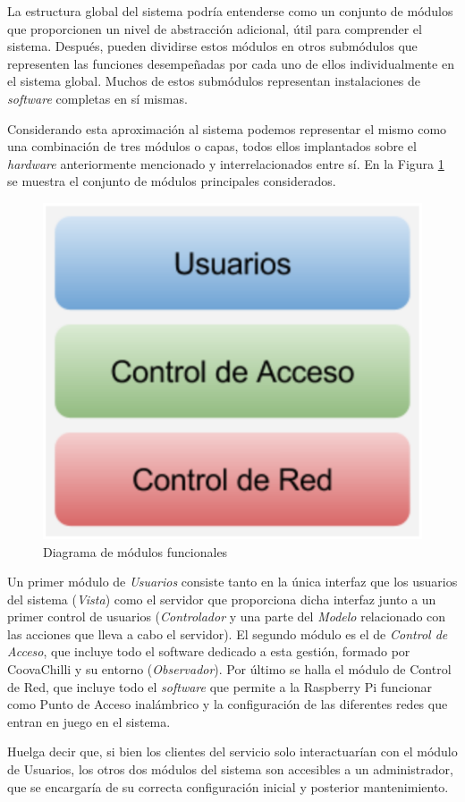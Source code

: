 La estructura global del sistema podría entenderse como un conjunto de módulos que proporcionen un nivel de abstracción adicional, útil para comprender el sistema. Después, pueden dividirse estos módulos en otros submódulos que representen las funciones desempeñadas por cada uno de ellos individualmente en el sistema global. Muchos de estos submódulos representan instalaciones de \emph{software} completas en sí mismas.

Considerando esta aproximación al sistema podemos representar el mismo como una combinación de tres módulos o capas, todos ellos implantados sobre el \emph{hardware} anteriormente mencionado y interrelacionados entre sí. En la Figura \ref{modulos} se muestra el conjunto de módulos principales considerados.

\begin{figure}[!t]
\begin{center}
\includegraphics[width=0.5\linewidth]{./4_AnalisisFuncional/Img/modulos.png}
\end{center}
\caption{Diagrama de módulos funcionales}
\label{modulos}
\end{figure}

Un primer módulo de \emph{Usuarios} consiste tanto en la única interfaz que los usuarios del sistema (\emph{Vista}) como el servidor que proporciona dicha interfaz junto a un primer control de usuarios (\emph{Controlador} y una parte del \emph{Modelo} relacionado con las acciones que lleva a cabo el servidor). El segundo módulo es el de \emph{Control de Acceso}, que incluye todo el software dedicado a esta gestión, formado por CoovaChilli y su entorno (\emph{Observador}). Por último se halla el módulo de Control de Red, que incluye todo el \emph{software} que permite a la Raspberry Pi funcionar como Punto de Acceso inalámbrico y la configuración de las diferentes redes que entran en juego en el sistema.

Huelga decir que, si bien los clientes del servicio solo interactuarían con el módulo de Usuarios, los otros dos módulos del sistema son accesibles a un administrador, que se encargaría de su correcta configuración inicial y posterior mantenimiento.

